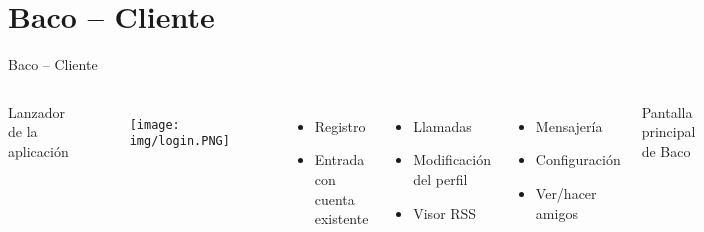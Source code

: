 \documentclass[compress,aspectratio=169]{beamer}
\begin{document}
	\section{Baco -- Cliente}
	\begin{frame}{Baco -- Cliente}
		
		
		\begin{columns}
			\begin{center}
				Lanzador de la aplicación
			\end{center}
			\begin{figure}
				\centering
				\texttt{[image: img/login.PNG]}
			\end{figure}
			\begin{itemize}
				\item Registro
				\item Entrada con cuenta existente
			\end{itemize}
			\begin{columns}
				\begin{itemize}
					\item Llamadas
					\item Modificación del perfil
					\item Visor RSS
				\end{itemize}
				\begin{itemize}
					\item Mensajería
					\item Configuración
					\item Ver/hacer amigos
				\end{itemize}
			\end{columns}
			\begin{center}
				Pantalla principal de Baco
			\end{center}
			\begin{figure}
				\centering
				\texttt{[image: img/hub.PNG]}
			\end{figure}
			
		\end{columns}
	\end{frame}
\end{document}

